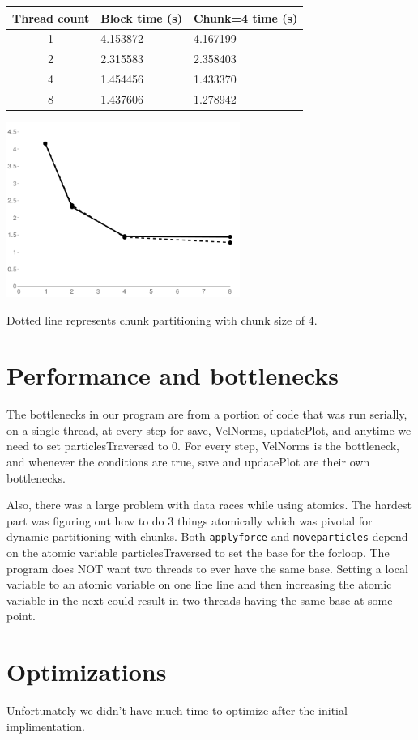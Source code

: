 \documentclass{article}[12pt;letterpaper]
\begin{document}
\begin{center}
\begin{tabular}{c l l}
Thread count & Block time (s) & Chunk=4 time (s) \\
\hline{}
1 & 4.153872 & 4.167199 \\
2 & 2.315583 & 2.358403 \\
4 & 1.454456 & 1.433370 \\
8 & 1.437606 & 1.278942
\end{tabular}

\includegraphics[width=3in]{a2_sec3_1.png}
\end{center}

Dotted line represents chunk partitioning with chunk size of 4.

\section{Performance and bottlenecks}

The bottlenecks in our program are from a portion of code that was run serially, on a 
single thread, at every step for save, VelNorms, updatePlot, and anytime we need to 
set particlesTraversed to 0. For every step, VelNorms is the bottleneck, and whenever
the conditions are true, save and updatePlot are their own bottlenecks.

Also, there was a large problem with data races while using atomics. The hardest part
was figuring out how to do 3 things atomically which was pivotal for dynamic 
partitioning with chunks. Both \texttt{apply\textunderscore{}force} and \texttt{move\textunderscore{}particles} depend on the atomic
variable particlesTraversed to set the base for the forloop. The program does NOT
want two threads to ever have the same base. Setting a local variable to an atomic 
variable on one line line and then increasing the atomic variable in the next could 
result in two threads having the same base at some point.

\section{Optimizations}

Unfortunately we didn't have much time to optimize after the initial implimentation.
\end{document}
